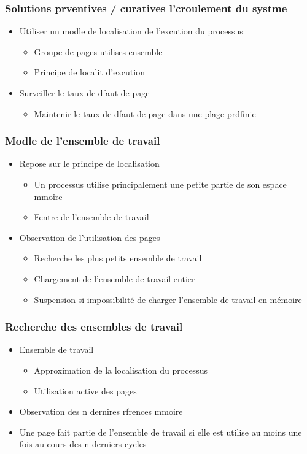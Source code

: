 \begin{frame}
\frametitle{Solutions prventives / curatives  l'croulement du systme}
\begin{itemize}
\item Utiliser un modle de localisation de l'excution du processus
\begin{itemize}
\item Groupe de pages utilises ensemble
\item Principe de localit d'excution
\end{itemize}
\item Surveiller le taux de dfaut de page
\begin{itemize}
\item Maintenir le taux de dfaut de page dans une plage prdfinie
\end{itemize}
\end{itemize}
\end{frame}


\begin{frame}
\frametitle{Modle de l'ensemble de travail}
\begin{itemize}
\item Repose sur le principe de localisation
\begin{itemize}
\item Un processus utilise principalement une petite partie de son espace mmoire
\item Fentre de l'ensemble de travail
\end{itemize}
\item Observation de l'utilisation des pages
\begin{itemize}
\item Recherche les plus petits ensemble de travail
\item Chargement de l'ensemble de travail entier
\item Suspension si impossibilité de charger l'ensemble de travail en mémoire
\end{itemize}
\end{itemize}
\end{frame}


\begin{frame}
\frametitle{Recherche des ensembles de travail}
\begin{itemize}
\item Ensemble de travail
\begin{itemize}
\item Approximation de la localisation du processus
\item Utilisation active des pages
\end{itemize}
\item Observation des n dernires rfrences mmoire
\item Une page fait partie de l'ensemble de travail si elle est utilise au moins une fois au cours des n derniers cycles
\end{itemize}
\end{frame}


